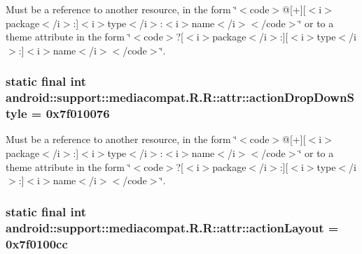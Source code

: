 Must be a reference to another resource, in the form \char`\"{}$<$code$>$@\mbox{[}+\mbox{]}\mbox{[}$<$i$>$package$<$/i$>$:\mbox{]}$<$i$>$type$<$/i$>$:$<$i$>$name$<$/i$>$$<$/code$>$\char`\"{} or to a theme attribute in the form \char`\"{}$<$code$>$?\mbox{[}$<$i$>$package$<$/i$>$:\mbox{]}\mbox{[}$<$i$>$type$<$/i$>$:\mbox{]}$<$i$>$name$<$/i$>$$<$/code$>$\char`\"{}. \hypertarget{classandroid_1_1support_1_1mediacompat_1_1_r_1_1attr_8e72fe9d1750297751451ff23e896a05}{
\subsubsection[{actionDropDownStyle}]{\setlength{\rightskip}{0pt plus 5cm}static final int android::support::mediacompat.R.R::attr::actionDropDownStyle = 0x7f010076}}
\label{classandroid_1_1support_1_1mediacompat_1_1_r_1_1attr_8e72fe9d1750297751451ff23e896a05}


Must be a reference to another resource, in the form \char`\"{}$<$code$>$@\mbox{[}+\mbox{]}\mbox{[}$<$i$>$package$<$/i$>$:\mbox{]}$<$i$>$type$<$/i$>$:$<$i$>$name$<$/i$>$$<$/code$>$\char`\"{} or to a theme attribute in the form \char`\"{}$<$code$>$?\mbox{[}$<$i$>$package$<$/i$>$:\mbox{]}\mbox{[}$<$i$>$type$<$/i$>$:\mbox{]}$<$i$>$name$<$/i$>$$<$/code$>$\char`\"{}. \hypertarget{classandroid_1_1support_1_1mediacompat_1_1_r_1_1attr_e8946766f65fd1c384d1c189e230c5b5}{
\subsubsection[{actionLayout}]{\setlength{\rightskip}{0pt plus 5cm}static final int android::support::mediacompat.R.R::attr::actionLayout = 0x7f0100cc}}
\label{classandroid_1_1support_1_1mediacompat_1_1_r_1_1attr_e8946766f65fd1c384d1c189e230c5b5}


